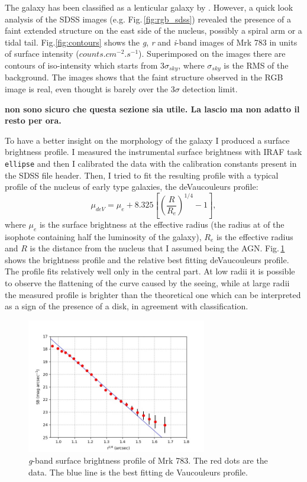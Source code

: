 \documentclass[../thesis.tex]{subfiles}
\begin{document}
The galaxy has been classified as a lenticular galaxy by \citep{Petrosian07}.
However, a quick look analysis of the SDSS images (e.g. Fig.\,\ref{fig:rgb_sdss}) revealed the presence of a faint extended structure on the east side of the nucleus, possibly a spiral arm or a tidal tail.
Fig.\ref{fig:contours} shows the \emph{g}, \emph{r} and \emph{i}-band images of Mrk 783 in units of surface intensity ($\si{counts.cm^{-2}.s^{-1}}$).
Superimposed on the images there are contours of iso-intensity which starts from $3\sigma_{sky}$, where $\sigma_{sky}$ is the RMS of the background.
The images shows that the faint structure observed in the RGB image is real, even thought is barely over the $3\sigma$ detection limit.


\textbf{non sono sicuro che questa sezione sia utile. La lascio ma non adatto il resto per ora.}

To have a better insight on the morphology of the galaxy I produced a surface brightness profile.
I measured the instrumental surface brightness with IRAF task \verb!ellipse! and then I calibrated the data with the calibration constants present in the SDSS file header.
Then, I tried to fit the resulting profile with a typical profile of the nucleus of early type galaxies, the deVaucouleurs profile:
\begin{equation}
    \label{eq:devauc}
    \mu_{deV} = \mu_e + 8.325\left[\left(\frac{R}{R_e}\right)^{1/4}-1\right],
\end{equation}
where $\mu_{e}$ is the surface brightness at the effective radius (the radius at of the isophote containing half the luminosity of the galaxy), $R_e$ is the effective radius and $R$ is the distance from the nucleus that I assumed being the AGN.
Fig.\,\ref{fig:mrk_dev} shows the brightness profile and the relative best fitting deVaucouleurs profile.
The profile fits relatively well only in the central part.
At low radii it is possible to observe the flattening of the curve caused by the seeing, while at large radii the measured profile is brighter than the theoretical one which can be interpreted as a sign of the presence of a disk, in agreement with \citet{Petrosian07} classification.

\begin{figure}
\centering
\includegraphics[width=0.7\textwidth]{images/paper3/devoc.jpg} 
\caption[]{\emph{g}-band surface brightness profile of Mrk 783. The red dots are the data. The blue line is the best fitting de Vaucouleurs profile.} 
\label{fig:mrk_dev}
\end{figure} 
\end{document}
